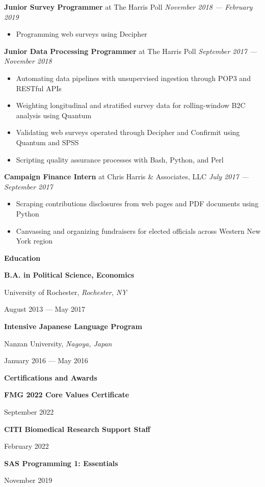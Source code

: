\documentclass[12pt]{article}
\begin{document}
\noindent \textbf{Junior Survey Programmer} at The Harris Poll \hfill \textit{November 2018 --- February 2019}
\begin{itemize}[]
\item Programming web surveys using Decipher
\end{itemize}

\noindent \textbf{Junior Data Processing Programmer} at The Harris Poll \hfill \textit{September 2017 --- November 2018}
\begin{itemize}[]
\item Automating data pipelines with unsupervised ingestion through POP3 and RESTful APIs
\item Weighting longitudinal and stratified survey data for rolling-window B2C analysis using Quantum
\item Validating web surveys operated through Decipher and Confirmit using Quantum and SPSS
\item Scripting quality assurance processes with Bash, Python, and Perl
\end{itemize}

\noindent \textbf{Campaign Finance Intern} at Chris Harris \& Associates, LLC \hfill \textit{July 2017 --- September 2017}
\begin{itemize}[]
\item Scraping contributions disclosures from web pages and PDF documents using Python
\item Canvassing and organizing fundraisers for elected officials across Western New York region
\end{itemize}

\large
\noindent \textbf{Education} \hrulefill
\normalsize

\begin{multicols}{2}[]
\noindent \textbf{B.A. in Political Science, Economics} \par
University of Rochester, \textit{Rochester, NY} \par
August 2013 --- May 2017

\noindent \textbf{Intensive Japanese Language Program} \par
Nanzan University, \textit{Nagoya, Japan} \par
January 2016 --- May 2016
\end{multicols}

\large
\noindent \textbf{Certifications and Awards} \hrulefill
\normalsize

\begin{multicols}{2}[]
\noindent \textbf{FMG 2022 Core Values Certificate} \par
September 2022

\noindent \textbf{CITI Biomedical Research Support Staff} \par
February 2022

\noindent \textbf{SAS Programming 1: Essentials} \par
November 2019

\vfill\null

\end{multicols}
\end{document}
